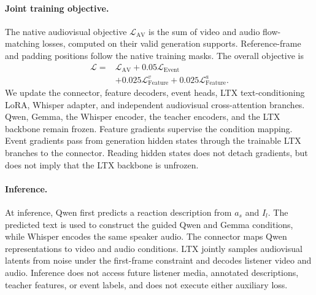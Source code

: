 \paragraph{Joint training objective.}
The native audiovisual objective $\mathcal L_{\mathrm{AV}}$ is the sum of video and audio flow-matching losses, computed on their valid generation supports. Reference-frame and padding positions follow the native training masks. The overall objective is
\begin{equation}
\begin{split}
\mathcal L ={}& \mathcal L_{\mathrm{AV}} + 0.05\mathcal L_{\mathrm{Event}}\\
&+0.025\mathcal L_{\mathrm{Feature}}^v
 +0.025\mathcal L_{\mathrm{Feature}}^a.
\end{split}
\label{eq:total}
\end{equation}
We update the connector, feature decoders, event heads, LTX text-conditioning LoRA, Whisper adapter, and independent audiovisual cross-attention branches. Qwen, Gemma, the Whisper encoder, the teacher encoders, and the LTX backbone remain frozen. Feature gradients supervise the condition mapping. Event gradients pass from generation hidden states through the trainable LTX branches to the connector. Reading hidden states does not detach gradients, but does not imply that the LTX backbone is unfrozen.

\paragraph{Inference.}
At inference, Qwen first predicts a reaction description from $a_s$ and $I_l$. The predicted text is used to construct the guided Qwen and Gemma conditions, while Whisper encodes the same speaker audio. The connector maps Qwen representations to video and audio conditions. LTX jointly samples audiovisual latents from noise under the first-frame constraint and decodes listener video and audio. Inference does not access future listener media, annotated descriptions, teacher features, or event labels, and does not execute either auxiliary loss.
